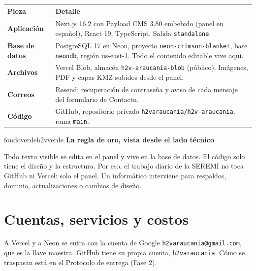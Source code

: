 \documentclass[11pt,letterpaper]{article}
\newcommand{\var}[1]{\nolinkurl{#1}}
\newcommand{\titulorecuadro}[2]{{\bfseries\color{#1}#2}\par\vspace{2pt}}
\newcommand{\cab}[1]{\textbf{\color{h2vgris}#1}}
\newcommand{\fila}[1]{\textbf{\color{h2vazul}#1}}
\begin{document}
\begin{tabularx}{\textwidth}{@{}P{3.6cm}Y@{}}
\toprule
\cab{Pieza} & \cab{Detalle}\\
\midrule
\fila{Aplicación} & Next.js 16.2 con Payload CMS 3.80 embebido (panel en español), React 19, TypeScript. Salida \texttt{standalone}. \\
\fila{Base de datos} & PostgreSQL 17 en Neon, proyecto \var{neon-crimson-blanket}, base \var{neondb}, región us-east-1. Todo el contenido editable vive aquí. \\
\fila{Archivos} & Vercel Blob, almacén \var{h2v-araucania-blob} (público). Imágenes, PDF y capas KMZ subidos desde el panel. \\
\fila{Correos} & Resend: recuperación de contraseña y aviso de cada mensaje del formulario de Contacto. \\
\fila{Código} & GitHub, repositorio privado \var{h2varaucania/h2v-araucania}, rama \var{main}. \\
\bottomrule
\end{tabularx}

\begin{recuadro}{fondoverde}{h2vverde}
\titulorecuadro{h2vverde}{La regla de oro, vista desde el lado técnico}
Todo texto visible se edita en el panel y vive en la base de datos. El código solo tiene el diseño y la estructura. Por eso, el trabajo diario de la SEREMI no toca GitHub ni Vercel: solo el panel. Un informático interviene para respaldos, dominio, actualizaciones o cambios de diseño.
\end{recuadro}

\section{Cuentas, servicios y costos}

A Vercel y a Neon se entra con la cuenta de Google \var{h2varaucania@gmail.com}, que es la llave maestra. GitHub tiene su propia cuenta, \var{h2varaucania}. Cómo se traspasan está en el Protocolo de entrega (Fase 2).
\end{document}
